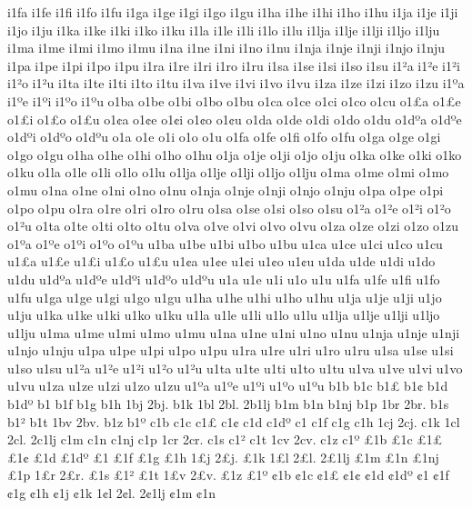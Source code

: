 {i1fa
i1fe
i1fi
i1fo
i1fu
i1ga
i1ge
i1gi
i1go
i1gu
i1ha
i1he
i1hi
i1ho
i1hu
i1ja
i1je
i1ji
i1jo
i1ju
i1ka
i1ke
i1ki
i1ko
i1ku
i1la
i1le
i1li
i1lo
i1lu
i1lja
i1lje
i1lji
i1ljo
i1lju
i1ma
i1me
i1mi
i1mo
i1mu
i1na
i1ne
i1ni
i1no
i1nu
i1nja
i1nje
i1nji
i1njo
i1nju
i1pa
i1pe
i1pi
i1po
i1pu
i1ra
i1re
i1ri
i1ro
i1ru
i1sa
i1se
i1si
i1so
i1su
i1^^b2a
i1^^b2e
i1^^b2i
i1^^b2o
i1^^b2u
i1ta
i1te
i1ti
i1to
i1tu
i1va
i1ve
i1vi
i1vo
i1vu
i1za
i1ze
i1zi
i1zo
i1zu
i1^^baa
i1^^bae
i1^^bai
i1^^bao
i1^^bau
o1ba
o1be
o1bi
o1bo
o1bu
o1ca
o1ce
o1ci
o1co
o1cu
o1^^a3a
o1^^a3e
o1^^a3i
o1^^a3o
o1^^a3u
o1^^a2a
o1^^a2e
o1^^a2i
o1^^a2o
o1^^a2u
o1da
o1de
o1di
o1do
o1du
o1d^^baa
o1d^^bae
o1d^^bai
o1d^^bao
o1d^^bau
o1^^9ea
o1^^9ee
o1^^9ei
o1^^9eo
o1^^9eu
o1fa
o1fe
o1fi
o1fo
o1fu
o1ga
o1ge
o1gi
o1go
o1gu
o1ha
o1he
o1hi
o1ho
o1hu
o1ja
o1je
o1ji
o1jo
o1ju
o1ka
o1ke
o1ki
o1ko
o1ku
o1la
o1le
o1li
o1lo
o1lu
o1lja
o1lje
o1lji
o1ljo
o1lju
o1ma
o1me
o1mi
o1mo
o1mu
o1na
o1ne
o1ni
o1no
o1nu
o1nja
o1nje
o1nji
o1njo
o1nju
o1pa
o1pe
o1pi
o1po
o1pu
o1ra
o1re
o1ri
o1ro
o1ru
o1sa
o1se
o1si
o1so
o1su
o1^^b2a
o1^^b2e
o1^^b2i
o1^^b2o
o1^^b2u
o1ta
o1te
o1ti
o1to
o1tu
o1va
o1ve
o1vi
o1vo
o1vu
o1za
o1ze
o1zi
o1zo
o1zu
o1^^baa
o1^^bae
o1^^bai
o1^^bao
o1^^bau
u1ba
u1be
u1bi
u1bo
u1bu
u1ca
u1ce
u1ci
u1co
u1cu
u1^^a3a
u1^^a3e
u1^^a3i
u1^^a3o
u1^^a3u
u1^^a2a
u1^^a2e
u1^^a2i
u1^^a2o
u1^^a2u
u1da
u1de
u1di
u1do
u1du
u1d^^baa
u1d^^bae
u1d^^bai
u1d^^bao
u1d^^bau
u1^^9ea
u1^^9ee
u1^^9ei
u1^^9eo
u1^^9eu
u1fa
u1fe
u1fi
u1fo
u1fu
u1ga
u1ge
u1gi
u1go
u1gu
u1ha
u1he
u1hi
u1ho
u1hu
u1ja
u1je
u1ji
u1jo
u1ju
u1ka
u1ke
u1ki
u1ko
u1ku
u1la
u1le
u1li
u1lo
u1lu
u1lja
u1lje
u1lji
u1ljo
u1lju
u1ma
u1me
u1mi
u1mo
u1mu
u1na
u1ne
u1ni
u1no
u1nu
u1nja
u1nje
u1nji
u1njo
u1nju
u1pa
u1pe
u1pi
u1po
u1pu
u1ra
u1re
u1ri
u1ro
u1ru
u1sa
u1se
u1si
u1so
u1su
u1^^b2a
u1^^b2e
u1^^b2i
u1^^b2o
u1^^b2u
u1ta
u1te
u1ti
u1to
u1tu
u1va
u1ve
u1vi
u1vo
u1vu
u1za
u1ze
u1zi
u1zo
u1zu
u1^^baa
u1^^bae
u1^^bai
u1^^bao
u1^^bau
%
b1b
b1c
b1^^a3
b1^^a2
b1d
b1d^^ba
b1^^9e
b1f
b1g
b1h
1bj
2bj.
b1k
1bl
2bl.
2b1lj
b1m
b1n
b1nj
b1p
1br
2br.
b1s
b1^^b2
b1t
1bv
2bv.
b1z
b1^^ba
c1b
c1c
c1^^a3
c1^^a2
c1d
c1d^^ba
c1^^9e
c1f
c1g
c1h
1cj
2cj.
c1k
1cl
2cl.
2c1lj
c1m
c1n
c1nj
c1p
1cr
2cr.
c1s
c1^^b2
c1t
1cv
2cv.
c1z
c1^^ba
^^a31b
^^a31c
^^a31^^a3
^^a31^^a2
^^a31d
^^a31d^^ba
^^a31^^9e
^^a31f
^^a31g
^^a31h
1^^a3j
2^^a3j.
^^a31k
1^^a3l
2^^a3l.
2^^a31lj
^^a31m
^^a31n
^^a31nj
^^a31p
1^^a3r
2^^a3r.
^^a31s
^^a31^^b2
^^a31t
1^^a3v
2^^a3v.
^^a31z
^^a31^^ba
^^a21b
^^a21c
^^a21^^a3
^^a21^^a2
^^a21d
^^a21d^^ba
^^a21^^9e
^^a21f
^^a21g
^^a21h
^^a21j
^^a21k
1^^a2l
2^^a2l.
2^^a21lj
^^a21m
^^a21n
}
